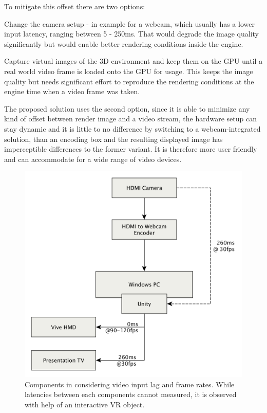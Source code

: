 To mitigate this offset there are two options:

\begin{my_list}
	\item Change the camera setup - in example for a webcam, which usually has 
	a lower input latency, ranging between 5 - 250ms. That would degrade the 
	image quality significantly but would enable better rendering conditions 
	inside the engine.
	\item Capture virtual images of the 3D environment and keep them on the GPU 
	until a real world video frame is loaded onto the GPU for usage. This keeps 
	the image quality but needs significant effort to reproduce the rendering 
	conditions at the engine time when a video frame was taken. 
\end{my_list}

The proposed solution uses the second option, since it is able to minimize any 
kind of offset between render image and a video stream, the hardware setup can 
stay dynamic and it is little to no difference by switching to a 
webcam-integrated solution, than an encoding box and the resulting displayed 
image has imperceptible differences to the former variant. It is therefore more 
user friendly and can accommodate for a wide range of video devices.

\begin{figure}[htb]
	\includegraphics[width=\textwidth]{gfx/FPS-Timing-Components.png}
	\caption{Components in considering video input lag and frame rates. While 
	latencies between each components cannot measured, it is observed with help 
	of an interactive VR object.}
	\label{fig:offsets:components}
\end{figure}

